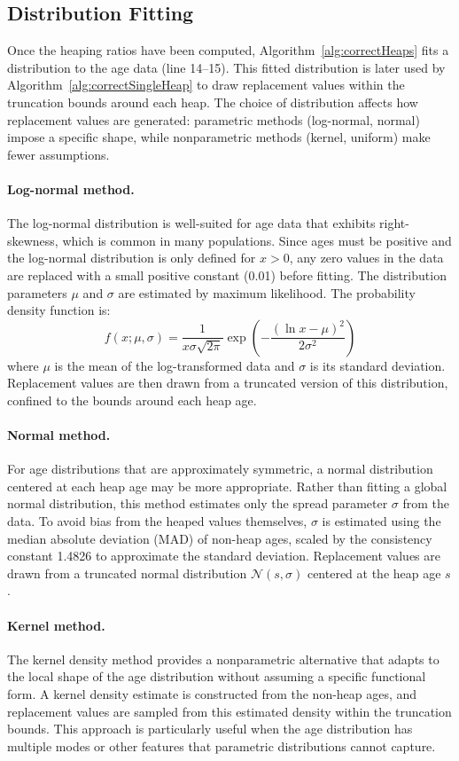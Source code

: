 \documentclass[pdflatex,sn-mathphys-num]{sn-jnl}%
\theoremstyle{thmstyleone}%
\theoremstyle{thmstyletwo}%
\theoremstyle{thmstylethree}%
\begin{document}
\subsection{Distribution Fitting}\label{sec:distfit}

Once the heaping ratios have been computed, Algorithm~\ref{alg:correctHeaps} fits a distribution to the age data (line 14--15). This fitted distribution is later used by Algorithm~\ref{alg:correctSingleHeap} to draw replacement values within the truncation bounds around each heap. The choice of distribution affects how replacement values are generated: parametric methods (log-normal, normal) impose a specific shape, while nonparametric methods (kernel, uniform) make fewer assumptions.

\paragraph{Log-normal method.} The log-normal distribution is well-suited for age data that exhibits right-skewness, which is common in many populations. Since ages must be positive and the log-normal distribution is only defined for $x > 0$, any zero values in the data are replaced with a small positive constant (0.01) before fitting. The distribution parameters $\mu$ and $\sigma$ are estimated by maximum likelihood. The probability density function is:
\[
f(x; \mu, \sigma) = \frac{1}{x\sigma\sqrt{2\pi}} \exp\left(-\frac{(\ln x - \mu)^2}{2\sigma^2}\right)
\]
where $\mu$ is the mean of the log-transformed data and $\sigma$ is its standard deviation. Replacement values are then drawn from a truncated version of this distribution, confined to the bounds around each heap age.

\paragraph{Normal method.} For age distributions that are approximately symmetric, a normal distribution centered at each heap age may be more appropriate. Rather than fitting a global normal distribution, this method estimates only the spread parameter $\sigma$ from the data. To avoid bias from the heaped values themselves, $\sigma$ is estimated using the median absolute deviation (MAD) of non-heap ages, scaled by the consistency constant 1.4826 to approximate the standard deviation. Replacement values are drawn from a truncated normal distribution $\mathcal{N}(s, \sigma)$ centered at the heap age $s$.

\paragraph{Kernel method.} The kernel density method provides a nonparametric alternative that adapts to the local shape of the age distribution without assuming a specific functional form. A kernel density estimate is constructed from the non-heap ages, and replacement values are sampled from this estimated density within the truncation bounds. This approach is particularly useful when the age distribution has multiple modes or other features that parametric distributions cannot capture.
\end{document}
